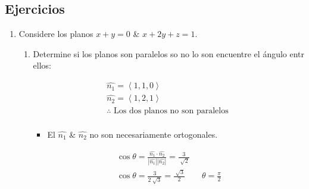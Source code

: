 \subsection{Ejercicios}
\begin{enumerate}
    \item Considere los planos $x+y=0$ \& $x+2y+z=1$.
        \begin{enumerate}
            \item Determine si los planos son paralelos so no lo son encuentre el ángulo entr ellos:
                \begin{center}
                    \begin{align*}
                        \hat{n_1} = \left\langle 1,1,0 \right\rangle \\ 
                        \hat{n_2} = \left\langle 1,2,1 \right\rangle \\ 
                        \therefore \text{  Los dos planos no son paralelos  } \\ 
                    \end{align*}
                    \begin{itemize}
                        \item El $\hat{n_1}$ \& $\hat{n_2}$ no son necesariamente ortogonales.
                    \end{itemize}
                    \begin{align*}
                        \cos \theta = \frac{\hat{n_1}\cdot\hat{n_2}}{\left| \hat{n_1} \right|\left| \hat{n_2} \right| } = \frac{3}{\sqrt[]{2}} \\ 
                        \cos \theta = \frac{3}{2\sqrt[]{3}}=\frac{\sqrt[]{3}}{2} \qquad \theta = \frac{\pi}{2} \\   
                    \end{align*}
                \end{center}
        \end{enumerate}
    

\end{enumerate}
